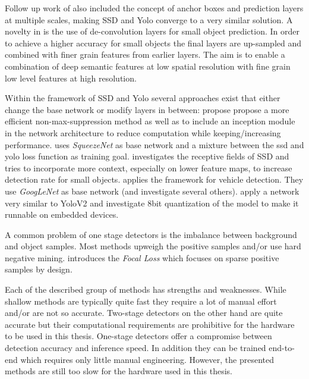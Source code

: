 Follow up work of \citeauthor{Redmon}\cite{Redmon, Redmona} also included the concept of anchor boxes and prediction layers at multiple scales, making \ac{SSD} and \ac{Yolo} converge to a very similar solution. A novelty in \cite{Redmona} is the use of de-convolution layers for small object prediction. In order to achieve a higher accuracy for small objects the final layers are up-sampled and combined with finer grain features from earlier layers. The aim is to enable a combination of deep semantic features at low spatial resolution with fine grain low level features at high resolution.

Within the framework of \ac{SSD} and \ac{Yolo} several approaches exist that either change the base network or modify layers in between: \cite{ChengchengNing2017} propose propose a more efficient non-max-suppression method as well as to include an inception module in the network architecture to reduce computation while keeping/increasing performance. \cite{Wu} uses \textit{SqueezeNet} as base network and a mixture between the ssd and yolo loss function as training goal. \cite{Xiang} investigates the receptive fields of SSD and tries to incorporate more context, especially on lower feature maps, to increase detection rate for small objects.\cite{Linb} applies the framework for vehicle detection. They use \textit{GoogLeNet} as base network (and investigate several others).\cite{TripathiSanDiego} apply a network very similar to YoloV2 and investigate 8bit quantization of the model to make it runnable on embedded devices.

A common problem of one stage detectors is the imbalance between background and object samples. Most methods upweigh the positive samples and/or use hard negative mining. \cite{Lin} introduces the \textit{Focal Loss} which focuses on sparse positive samples by design.



Each of the described group of methods has strengths and weaknesses. While shallow methods are typically quite fast they require a lot of manual effort and/or are not so accurate. Two-stage detectors on the other hand are quite accurate but their computational requirements are prohibitive for the hardware to be used in this thesis. One-stage detectors offer a compromise between detection accuracy and inference speed. In addition they can be trained end-to-end which requires only little manual engineering. However, the presented methods are still too slow for the hardware used in this thesis.

